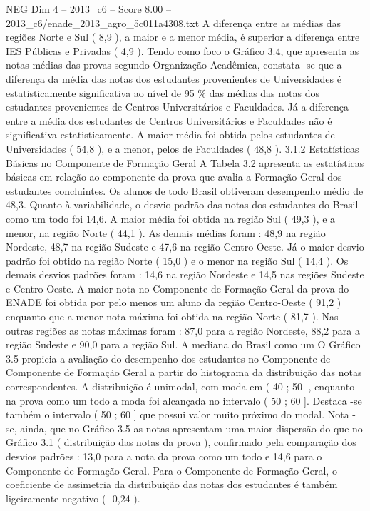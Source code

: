 \begin{textsample}{NEG Dim 4 – 2013\_c6 – Score 8.00 – 2013\_c6/enade\_2013\_agro\_5c011a4308.txt}
A diferença entre as médias das regiões Norte e Sul ( 8,9 ), a maior e a menor média, é superior a diferença entre IES Públicas e Privadas ( 4,9 ).
Tendo como foco o Gráfico 3.4, que apresenta as notas médias das provas segundo Organização Acadêmica, constata -se que a diferença da média das notas dos estudantes provenientes de Universidades é estatisticamente significativa ao nível de 95 \% das médias das notas dos estudantes provenientes de Centros Universitários e Faculdades.
Já a diferença entre a média dos estudantes de Centros Universitários e Faculdades não é significativa estatisticamente.
A maior média foi obtida pelos estudantes de Universidades ( 54,8 ), e a menor, pelos de Faculdades ( 48,8 ). 3.1.2 Estatísticas Básicas no Componente de Formação Geral A Tabela 3.2 apresenta as estatísticas básicas em relação ao componente da prova que avalia a Formação Geral dos estudantes concluintes.
Os alunos de todo Brasil obtiveram desempenho médio de 48,3.
Quanto à variabilidade, o desvio padrão das notas dos estudantes do Brasil como um todo foi 14,6.
A maior média foi obtida na região Sul ( 49,3 ), e a menor, na região Norte ( 44,1 ).
As demais médias foram : 48,9 na região Nordeste, 48,7 na região Sudeste e 47,6 na região Centro-Oeste.
Já o maior desvio padrão foi obtido na região Norte ( 15,0 ) e o menor na região Sul ( 14,4 ).
Os demais desvios padrões foram : 14,6 na região Nordeste e 14,5 nas regiões Sudeste e Centro-Oeste.
A maior nota no Componente de Formação Geral da prova do ENADE foi obtida por pelo menos um aluno da região Centro-Oeste ( 91,2 ) enquanto que a menor nota máxima foi obtida na região Norte ( 81,7 ).
Nas outras regiões as notas máximas foram : 87,0 para a região Nordeste, 88,2 para a região Sudeste e 90,0 para a região Sul.
A mediana do Brasil como um O Gráfico 3.5 propicia a avaliação do desempenho dos estudantes no Componente de Componente de Formação Geral a partir do histograma da distribuição das notas correspondentes.
A distribuição é unimodal, com moda em ( 40 ; 50 ], enquanto na prova como um todo a moda foi alcançada no intervalo ( 50 ; 60 ].
Destaca -se também o intervalo ( 50 ; 60 ] que possui valor muito próximo do modal.
Nota -se, ainda, que no Gráfico 3.5 as notas apresentam uma maior dispersão do que no Gráfico 3.1 ( distribuição das notas da prova ), confirmado pela comparação dos desvios padrões : 13,0 para a nota da prova como um todo e 14,6 para o Componente de Formação Geral.
Para o Componente de Formação Geral, o coeficiente de assimetria da distribuição das notas dos estudantes é também ligeiramente negativo ( -0,24 ).

\end{textsample}
